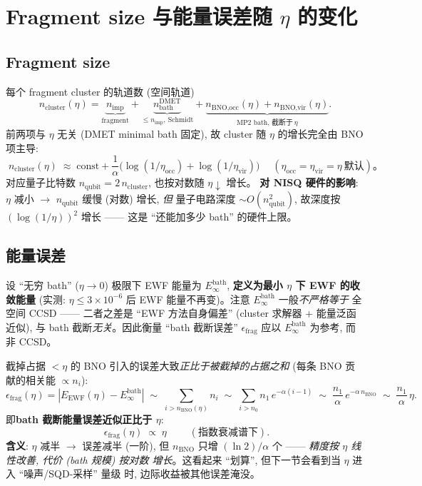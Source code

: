 \documentclass[11pt]{article}
\begin{document}
\section{Fragment size 与能量误差随 $\eta$ 的变化}
\subsection*{Fragment size}
每个 fragment cluster 的轨道数 (空间轨道)
\[
  n_{\text{cluster}}(\eta)
  = \underbrace{n_{\text{imp}}}_{\text{fragment}}
  + \underbrace{n_{\text{bath}}^{\text{DMET}}}_{\le n_{\text{imp}},\ \text{Schmidt}}
  + \underbrace{n_{\text{BNO,occ}}(\eta)+n_{\text{BNO,vir}}(\eta)}_{\text{MP2 bath, 截断于}\ \eta}.
\]
前两项与 $\eta$ 无关 (DMET minimal bath 固定), 故 cluster 随 $\eta$ 的增长完全由
BNO 项主导:
\[
  \boxed{\;n_{\text{cluster}}(\eta)\;\approx\;\text{const}+\frac{1}{\alpha}\big(\log(1/\eta_{\text{occ}})+\log(1/\eta_{\text{vir}})\big)\;}
  \quad (\eta_{\text{occ}}=\eta_{\text{vir}}=\eta\ \text{默认})。
\]
对应量子比特数 $n_{\text{qubit}}=2\,n_{\text{cluster}}$, 也按对数随 $\eta\!\downarrow$ 增长。
\textbf{对 NISQ 硬件的影响}: $\eta$ 减小 $\to$ $n_{\text{qubit}}$ 缓慢 (对数) 增长,
\emph{但} 量子电路深度 $\sim O(n_{\text{qubit}}^2)$, 故深度按 $(\log(1/\eta))^2$
增长 —— 这是 ``还能加多少 bath'' 的硬件上限。

\subsection*{能量误差}
设 ``无穷 bath'' ($\eta\to 0$) 极限下 EWF 能量为 $E_{\infty}^{\text{bath}}$,
\textbf{定义为最小 $\eta$ 下 EWF 的收敛能量} (实测: $\eta\le3\times10^{-6}$ 后
EWF 能量不再变)。注意 $E_{\infty}^{\text{bath}}$ 一般\emph{不严格等于} 全空间
CCSD —— 二者之差是 ``EWF 方法自身偏差'' (cluster 求解器 + 能量泛函近似), 与
bath 截断\emph{无关}。因此衡量 ``bath 截断误差'' $\epsilon_{\text{frag}}$ 应以
$E_{\infty}^{\text{bath}}$ 为参考, 而非 CCSD。

截掉占据 $<\eta$ 的 BNO 引入的误差大致\emph{正比于被截掉的占据之和}
(每条 BNO 贡献的相关能 $\propto n_i$):
\[
  \epsilon_{\text{frag}}(\eta)=|E_{\text{EWF}}(\eta)-E_{\infty}^{\text{bath}}|
  \;\sim\;\sum_{i>n_{\text{BNO}}(\eta)} n_i
  \;\sim\;\sum_{i>n_0} n_1\,e^{-\alpha(i-1)}
  \;\sim\; \frac{n_1}{\alpha}\,e^{-\alpha\, n_{\text{BNO}}}
  \;\sim\;\frac{n_1}{\alpha}\,\eta .
\]
即\textbf{bath 截断能量误差近似正比于 $\eta$}:
\[
  \boxed{\;\epsilon_{\text{frag}}(\eta)\;\propto\;\eta\;}
  \qquad(\text{指数衰减谱下}).
\]
\textbf{含义}: $\eta$ 减半 $\to$ 误差减半 (一阶), 但 $n_{\text{BNO}}$ 只增
$(\ln 2)/\alpha$ 个 —— \emph{精度按 $\eta$ 线性改善, 代价 (bath 规模) 按对数
增长}。这看起来 ``划算'', 但下一节会看到当 $\eta$ 进入 ``噪声/SQD-采样'' 量级
时, 边际收益被其他误差淹没。
\end{document}
